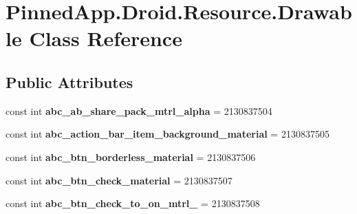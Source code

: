 \hypertarget{class_pinned_app_1_1_droid_1_1_resource_1_1_drawable}{}\section{Pinned\+App.\+Droid.\+Resource.\+Drawable Class Reference}
\label{class_pinned_app_1_1_droid_1_1_resource_1_1_drawable}
\subsection*{Public Attributes}
\begin{DoxyCompactItemize}
\item 
\mbox{\label{class_pinned_app_1_1_droid_1_1_resource_1_1_drawable_ae97e0844f3361211c7006b8f49a57ce2}} 
const int {\bfseries abc\+\_\+ab\+\_\+share\+\_\+pack\+\_\+mtrl\+\_\+alpha} = 2130837504
\item 
\mbox{\label{class_pinned_app_1_1_droid_1_1_resource_1_1_drawable_af61dd32e13bd7adb061b979926ddcabd}} 
const int {\bfseries abc\+\_\+action\+\_\+bar\+\_\+item\+\_\+background\+\_\+material} = 2130837505
\item 
\mbox{\label{class_pinned_app_1_1_droid_1_1_resource_1_1_drawable_a06d68a78a6c4e6c205650681aef392af}} 
const int {\bfseries abc\+\_\+btn\+\_\+borderless\+\_\+material} = 2130837506
\item 
\mbox{\label{class_pinned_app_1_1_droid_1_1_resource_1_1_drawable_aa41e561158e7c879f8364a8049666144}} 
const int {\bfseries abc\+\_\+btn\+\_\+check\+\_\+material} = 2130837507
\item 
\mbox{\label{class_pinned_app_1_1_droid_1_1_resource_1_1_drawable_adca8d54cece90862d6429cefd64495c0}} 
const int {\bfseries abc\+\_\+btn\+\_\+check\+\_\+to\+\_\+on\+\_\+mtrl\+\_} = 2130837508
\item 
\mbox{\label{class_pinned_app_1_1_droid_1_1_resource_1_1_drawable_a0b36260927452c4f7647175a22897809}} 

\end{DoxyCompactItemize}
